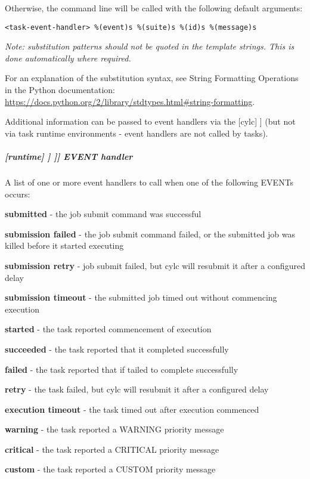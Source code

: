 Otherwise, the command line will be called with the following default
arguments:
\begin{lstlisting}
<task-event-handler> %(event)s %(suite)s %(id)s %(message)s
\end{lstlisting}

{\em Note: substitution patterns should not be quoted in the template strings.
This is done automatically where required.}

For an explanation of the substitution syntax, see String Formatting Operations
in the Python documentation:
\url{https://docs.python.org/2/library/stdtypes.html#string-formatting}.

Additional information can be passed to event handlers via the
[cylc] \textrightarrow [[environment]] (but not via task
runtime environments - event handlers are not called by tasks).

\subparagraph[EVENT handler]{[runtime] \textrightarrow [[\_\_NAME\_\_]] \textrightarrow [[[events]]] \textrightarrow EVENT handler}

A list of one or more event handlers to call when one of the following EVENTs occurs:
\begin{myitemize}
    \item {\bf submitted}      - the job submit command was successful
    \item {\bf submission failed}  - the job submit command failed, or the
                                   submitted job was killed before it started executing
    \item {\bf submission retry}   - job submit failed, but cylc will resubmit it
                                   after a configured delay
    \item {\bf submission timeout} - the submitted job timed out without commencing execution

    \item {\bf started}        - the task reported commencement of execution
    \item {\bf succeeded}      - the task reported that it completed successfully
    \item {\bf failed}         - the task reported that if tailed to complete successfully
    \item {\bf retry}          - the task failed, but cylc will resubmit it
                                  after a configured delay
    \item {\bf execution timeout}        - the task timed out after execution commenced
    \item {\bf warning}        - the task reported a WARNING priority message
    \item {\bf critical}       - the task reported a CRITICAL priority message
    \item {\bf custom}       - the task reported a CUSTOM priority message
\end{myitemize}

